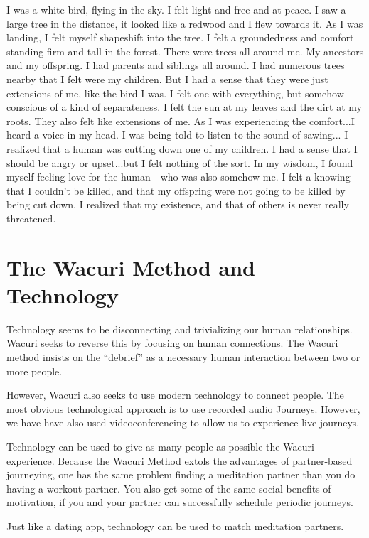 \documentclass[12pt]{book}
\begin{document}
I was a white bird, flying in the sky. I felt light and free and at
peace. I saw a large tree in the distance, it looked like a redwood
and I flew towards it. As I was landing, I felt myself shapeshift into
the tree. I felt a groundedness and comfort standing firm and tall in
the forest. There were trees all around me. My ancestors and my
offspring. I had parents and siblings all around. I had numerous trees
nearby that I felt were my children. But I had a sense that they were
just extensions of me, like the bird I was. I felt one with
everything, but somehow conscious of a kind of separateness. I felt
the sun at my leaves and the dirt at my roots. They also felt like
extensions of me. As I was experiencing the comfort...I heard a voice
in my head. I was being told to listen to the sound of sawing... I
realized that a human was cutting down one of my children. I had a
sense that I should be angry or upset...but I felt nothing of the
sort. In my wisdom, I found myself feeling love for the human - who
was also somehow me. I felt a knowing that I couldn't be killed, and
that my offspring were not going to be killed by being cut down. I
realized that my existence, and that of others is never really
threatened.

\chapter{The Wacuri Method and Technology}

Technology seems to be disconnecting and trivializing our human relationships.
Wacuri seeks to reverse this by focusing on human connections. The Wacuri method
insists on the ``debrief'' as a necessary human interaction between two or more people.

However, Wacuri also seeks to use modern technology to connect people.
The most obvious technological approach is to use recorded audio Journeys.
However, we have have also used videoconferencing to allow us to experience live journeys.

Technology can be used to give as many people as possible the Wacuri experience.
Because the Wacuri Method extols the advantages of partner-based journeying,
one has the same problem finding a meditation partner than you do having a
workout partner. You also get some of the same social benefits of motivation,
if you and your partner can successfully schedule periodic journeys.

Just like a dating app, technology can be used to match meditation partners.
\end{document}
